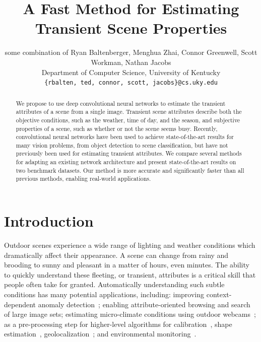 \documentclass[10pt,twocolumn,letterpaper]{article}
\begin{document}
\title{A Fast Method for Estimating Transient Scene Properties}


\author{some combination of Ryan Baltenberger, Menghua Zhai, Connor Greenwell, Scott Workman, Nathan Jacobs \\
  \vspace{-.75em} 
  Department of Computer Science, University of Kentucky \\
  {\tt\small \{rbalten, ted, connor, scott, jacobs\}@cs.uky.edu}
}

\maketitle
\ifwacvfinal\thispagestyle{empty}\fi


\begin{abstract}

We propose to use deep convolutional neural networks to estimate the
transient attributes of a scene from a single image.  Transient scene
attributes describe both the objective conditions, such as the
weather, time of day, and the season, and subjective properties of a
scene, such as whether or not the scene seems busy. Recently,
convolutional neural networks have been used to achieve
state-of-the-art results for many vision problems, from object
detection to scene classification, but have not previously been used
for estimating transient attributes. We compare several methods for
adapting an existing network architecture and present state-of-the-art
results on two benchmark datasets. Our method is more accurate and
significantly faster than all previous methods, enabling real-world
applications. 

\end{abstract}

\section{Introduction}
Outdoor scenes experience a wide range of lighting and weather conditions which
dramatically affect their appearance. A scene can change from rainy and
brooding to sunny and pleasant in a matter of hours, even minutes. The ability
to quickly understand these fleeting, or transient, attributes is a critical
skill that people often take for granted. Automatically understanding such
subtle conditions has many potential applications, including: improving
context-dependent anomaly detection~\cite{abrams12lost}; enabling
attribute-oriented browsing and search of large image
sets\cite{jacobs07amos,skyfinder}; estimating micro-climate conditions using
outdoor webcams~\cite{islam13webcamweather}; as a pre-processing step for
higher-level algorithms for
calibration~\cite{jacobs13cloudcalibration,workman2014rainbow}, shape
estimation~\cite{heliometric,abramsheliometric},
geolocalization~\cite{jacobs07geolocate}; and  environmental
monitoring~\cite{jacobs09webcamgis}. 
\end{document}
